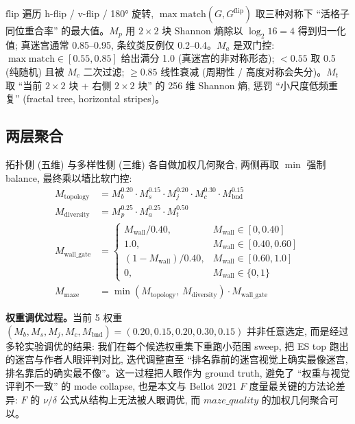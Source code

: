 $\mathrm{flip}$ 遍历 h-flip / v-flip / 180° 旋转, $\max \mathrm{match}(G, G^{\text{flip}})$ 取三种对称下 ``活格子同位重合率'' 的最大值。$M_p$ 用 $2{\times}2$ 块 Shannon 熵除以 $\log_2 16 = 4$ 得到归一化值; 真迷宫通常 0.85--0.95, 条纹类反例仅 0.2--0.4。$M_a$ 是双门控: $\max \mathrm{match} \in [0.55, 0.85]$ 给出满分 1.0 (真迷宫的非对称形态); $<0.55$ 取 0.5 (纯随机) 且被 $M_c$ 二次过滤; $\ge 0.85$ 线性衰减 (周期性 / 高度对称会失分)。$M_t$ 取 ``当前 $2{\times}2$ 块 + 右侧 $2{\times}2$ 块'' 的 256 维 Shannon 熵, 惩罚 ``小尺度低频重复'' (fractal tree, horizontal stripes)。

\subsection{两层聚合}

拓扑侧 (五维) 与多样性侧 (三维) 各自做加权几何聚合, 两侧再取 $\min$ 强制 balance, 最终乘以墙比软门控:
\begin{align}
  M_{\text{topology}} &= M_b^{0.20} \cdot M_s^{0.15} \cdot M_j^{0.20} \cdot M_c^{0.30} \cdot M_{\text{bnd}}^{0.15} \label{eq:topo}\\
  M_{\text{diversity}} &= M_p^{0.25} \cdot M_a^{0.25} \cdot M_t^{0.50} \label{eq:div}\\
  M_{\text{wall\_gate}} &= \begin{cases}
    M_{\text{wall}} / 0.40, & M_{\text{wall}} \in [0, 0.40] \\
    1.0, & M_{\text{wall}} \in [0.40, 0.60] \\
    (1 - M_{\text{wall}}) / 0.40, & M_{\text{wall}} \in [0.60, 1.0] \\
    0, & M_{\text{wall}} \in \{0, 1\}
  \end{cases} \label{eq:gate}\\
  M_{\text{maze}} &= \min\!\left(M_{\text{topology}},\, M_{\text{diversity}}\right) \cdot M_{\text{wall\_gate}} \label{eq:final}
\end{align}

\noindent\textbf{权重调优过程。}当前 5 权重 $(M_b, M_s, M_j, M_c, M_{\text{bnd}}) = (0.20, 0.15, 0.20, 0.30, 0.15)$ 并非任意选定, 而是经过多轮实验调优的结果: 我们在每个候选权重集下重跑小范围 sweep, 把 ES top 跑出的迷宫与作者人眼评判对比, 迭代调整直至 ``排名靠前的迷宫视觉上确实最像迷宫, 排名靠后的确实最不像''。这一过程把人眼作为 ground truth, 避免了 ``权重与视觉评判不一致'' 的 mode collapse, 也是本文与 Bellot 2021 $F$ 度量最关键的方法论差异: $F$ 的 $\nu/\delta$ 公式从结构上无法被人眼调优, 而 $maze\_quality$ 的加权几何聚合可以。

